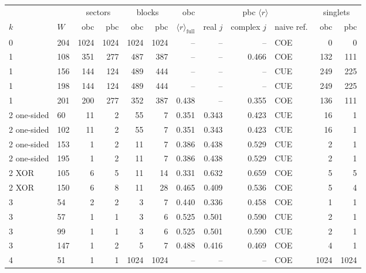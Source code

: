 \begin{tabular}{llrrrrrrrlrr}
\toprule
 & & \multicolumn{2}{c}{sectors} & \multicolumn{2}{c}{blocks} & obc & \multicolumn{3}{c}{pbc $\langle r\rangle$} & \multicolumn{2}{c}{singlets} \\
$k$ & $W$ & obc & pbc & obc & pbc & $\langle r\rangle_\mathrm{full}$ & real $j$ & complex $j$ & naive ref. & obc & pbc \\
\midrule
0 & 204 & 1024 & 1024 & 1024 & 1024 & -- & -- & -- & COE & 0 & 0 \\
1 & 108 & 351 & 277 & 487 & 387 & -- & -- & 0.466 & COE & 132 & 111 \\
1 & 156 & 144 & 124 & 489 & 444 & -- & -- & -- & CUE & 249 & 225 \\
1 & 198 & 144 & 124 & 489 & 444 & -- & -- & -- & CUE & 249 & 225 \\
1 & 201 & 200 & 277 & 352 & 387 & 0.438 & -- & 0.355 & COE & 136 & 111 \\
2 one-sided & 60 & 11 & 2 & 55 & 7 & 0.351 & 0.343 & 0.423 & CUE & 16 & 1 \\
2 one-sided & 102 & 11 & 2 & 55 & 7 & 0.351 & 0.343 & 0.423 & CUE & 16 & 1 \\
2 one-sided & 153 & 1 & 2 & 11 & 7 & 0.386 & 0.438 & 0.529 & CUE & 2 & 1 \\
2 one-sided & 195 & 1 & 2 & 11 & 7 & 0.386 & 0.438 & 0.529 & CUE & 2 & 1 \\
2 XOR & 105 & 6 & 5 & 11 & 14 & 0.331 & 0.632 & 0.659 & COE & 5 & 5 \\
2 XOR & 150 & 6 & 8 & 11 & 28 & 0.465 & 0.409 & 0.536 & COE & 5 & 4 \\
3 & 54 & 2 & 2 & 3 & 7 & 0.440 & 0.336 & 0.458 & COE & 1 & 1 \\
3 & 57 & 1 & 1 & 3 & 6 & 0.525 & 0.501 & 0.590 & CUE & 2 & 1 \\
3 & 99 & 1 & 1 & 3 & 6 & 0.525 & 0.501 & 0.590 & CUE & 2 & 1 \\
3 & 147 & 1 & 2 & 5 & 7 & 0.488 & 0.416 & 0.469 & COE & 4 & 1 \\
4 & 51 & 1 & 1 & 1024 & 1024 & -- & -- & -- & COE & 1024 & 1024 \\
\bottomrule
\end{tabular}
